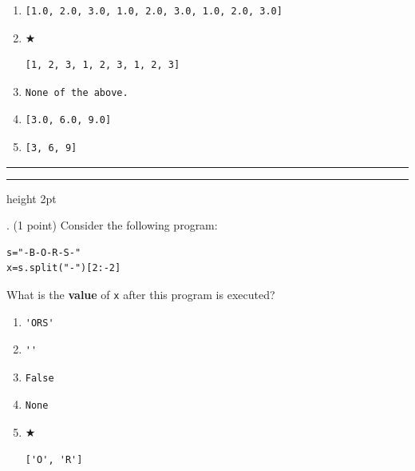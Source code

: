 \documentclass{article}
\begin{document}
\begin{enumerate}
\item[(A)]
\begin{verbatim}[1.0, 2.0, 3.0, 1.0, 2.0, 3.0, 1.0, 2.0, 3.0]\end{verbatim}

\item[(B)] $\bigstar$ 
\begin{verbatim}[1, 2, 3, 1, 2, 3, 1, 2, 3]\end{verbatim}

\item[(C)]
\begin{verbatim}None of the above.\end{verbatim}

\item[(D)]
\begin{verbatim}[3.0, 6.0, 9.0]\end{verbatim}

\item[(E)]
\begin{verbatim}[3, 6, 9]\end{verbatim}

\end{enumerate}

\vspace*{2em}
\hrule
\vspace{2em}

\vspace{2em}
\hrule height 2pt


\newpage
{}. (1 point)
Consider the following program:
\begin{verbatim}
s="-B-O-R-S-"
x=s.split("-")[2:-2]
\end{verbatim}
What is the \textbf{value} of \texttt{x} after this program is executed?


\begin{enumerate}
\item[(A)]
\begin{verbatim}'ORS'\end{verbatim}

\item[(B)]
\begin{verbatim}''\end{verbatim}

\item[(C)]
\begin{verbatim}False\end{verbatim}

\item[(D)]
\begin{verbatim}None\end{verbatim}

\item[(E)] $\bigstar$ 
\begin{verbatim}['O', 'R']\end{verbatim}

\end{enumerate}
\end{document}
